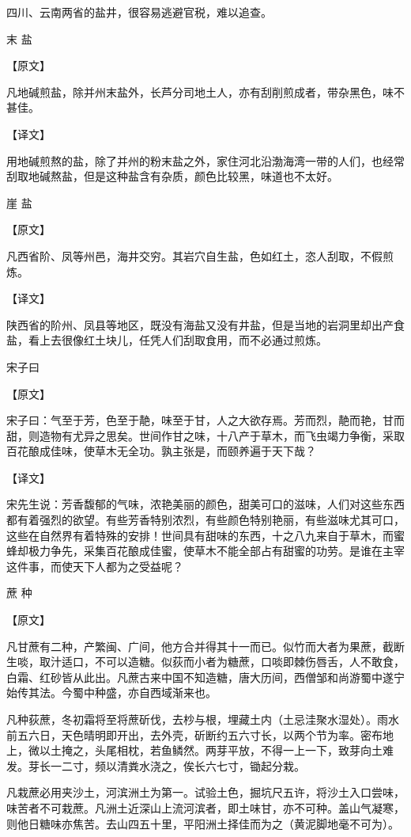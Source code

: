 \documentclass[12pt,UTF8]{ctexbook}
\begin{document}
四川、云南两省的盐井，很容易逃避官税，难以追查。

末 盐

【原文】

凡地碱煎盐，除并州末盐外，长芦分司地土人，亦有刮削煎成者，带杂黑色，味不甚佳。

【译文】

用地碱煎熬的盐，除了并州的粉末盐之外，家住河北沿渤海湾一带的人们，也经常刮取地碱熬盐，但是这种盐含有杂质，颜色比较黑，味道也不太好。

崖 盐

【原文】

凡西省阶、凤等州邑，海井交穷。其岩穴自生盐，色如红土，恣人刮取，不假煎炼。

【译文】

陕西省的阶州、凤县等地区，既没有海盐又没有井盐，但是当地的岩洞里却出产食盐，看上去很像红土块儿，任凭人们刮取食用，而不必通过煎炼。

宋子曰

【原文】

宋子曰：气至于芳，色至于靘，味至于甘，人之大欲存焉。芳而烈，靘而艳，甘而甜，则造物有尤异之思矣。世间作甘之味，十八产于草木，而飞虫竭力争衡，采取百花酿成佳味，使草木无全功。孰主张是，而颐养遍于天下哉？

【译文】

宋先生说：芳香馥郁的气味，浓艳美丽的颜色，甜美可口的滋味，人们对这些东西都有着强烈的欲望。有些芳香特别浓烈，有些颜色特别艳丽，有些滋味尤其可口，这些在自然界有着特殊的安排！世间具有甜味的东西，十之八九来自于草木，而蜜蜂却极力争先，采集百花酿成佳蜜，使草木不能全部占有甜蜜的功劳。是谁在主宰这件事，而使天下人都为之受益呢？

蔗 种

【原文】

凡甘蔗有二种，产繁闽、广间，他方合并得其十一而已。似竹而大者为果蔗，截断生啖，取汁适口，不可以造糖。似荻而小者为糖蔗，口啖即棘伤唇舌，人不敢食，白霜、红砂皆从此出。凡蔗古来中国不知造糖，唐大历间，西僧邹和尚游蜀中遂宁始传其法。今蜀中种盛，亦自西域渐来也。

凡种荻蔗，冬初霜将至将蔗斫伐，去杪与根，埋藏土内（土忌洼聚水湿处）。雨水前五六日，天色晴明即开出，去外壳，斫断约五六寸长，以两个节为率。密布地上，微以土掩之，头尾相枕，若鱼鳞然。两芽平放，不得一上一下，致芽向土难发。芽长一二寸，频以清粪水浇之，俟长六七寸，锄起分栽。

凡栽蔗必用夹沙土，河滨洲土为第一。试验土色，掘坑尺五许，将沙土入口尝味，味苦者不可栽蔗。凡洲土近深山上流河滨者，即土味甘，亦不可种。盖山气凝寒，则他日糖味亦焦苦。去山四五十里，平阳洲土择佳而为之（黄泥脚地毫不可为）。
\end{document}
